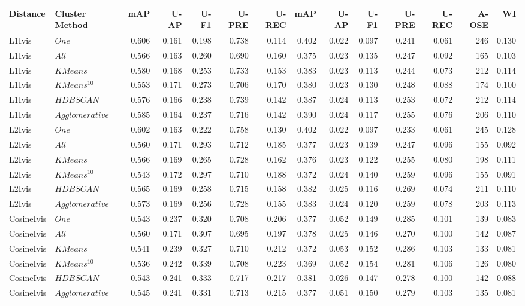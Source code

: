 \begin{tabular}{llrrrrrrrrrrrr}
\toprule
Distance & Cluster Method & mAP & U-AP & U-F1 & U-PRE & U-REC & mAP & U-AP & U-F1 & U-PRE & U-REC & A-OSE & WI \\
\midrule
L1Ivis & $One$ & 0.606 & 0.161 & 0.198 & 0.738 & 0.114 & 0.402 & 0.022 & 0.097 & 0.241 & 0.061 & 246 & 0.130 \\
L1Ivis & $All$ & 0.566 & 0.163 & 0.260 & 0.690 & 0.160 & 0.375 & 0.023 & 0.135 & 0.247 & 0.092 & 165 & 0.103 \\
L1Ivis & $KMeans$ & 0.580 & 0.168 & 0.253 & 0.733 & 0.153 & 0.383 & 0.023 & 0.113 & 0.244 & 0.073 & 212 & 0.114 \\
L1Ivis & $KMeans^{10}$ & 0.553 & 0.171 & 0.273 & 0.706 & 0.170 & 0.380 & 0.023 & 0.130 & 0.248 & 0.088 & 174 & 0.100 \\
L1Ivis & $HDBSCAN$ & 0.576 & 0.166 & 0.238 & 0.739 & 0.142 & 0.387 & 0.024 & 0.113 & 0.253 & 0.072 & 212 & 0.114 \\
L1Ivis & $Agglomerative$ & 0.585 & 0.164 & 0.237 & 0.716 & 0.142 & 0.390 & 0.024 & 0.117 & 0.255 & 0.076 & 206 & 0.110 \\
L2Ivis & $One$ & 0.602 & 0.163 & 0.222 & 0.758 & 0.130 & 0.402 & 0.022 & 0.097 & 0.233 & 0.061 & 245 & 0.128 \\
L2Ivis & $All$ & 0.560 & 0.171 & 0.293 & 0.712 & 0.185 & 0.377 & 0.023 & 0.139 & 0.247 & 0.096 & 155 & 0.092 \\
L2Ivis & $KMeans$ & 0.566 & 0.169 & 0.265 & 0.728 & 0.162 & 0.376 & 0.023 & 0.122 & 0.255 & 0.080 & 198 & 0.111 \\
L2Ivis & $KMeans^{10}$ & 0.543 & 0.172 & 0.297 & 0.710 & 0.188 & 0.372 & 0.024 & 0.140 & 0.259 & 0.096 & 155 & 0.091 \\
L2Ivis & $HDBSCAN$ & 0.565 & 0.169 & 0.258 & 0.715 & 0.158 & 0.382 & 0.025 & 0.116 & 0.269 & 0.074 & 211 & 0.110 \\
L2Ivis & $Agglomerative$ & 0.573 & 0.169 & 0.256 & 0.728 & 0.155 & 0.383 & 0.024 & 0.120 & 0.259 & 0.078 & 203 & 0.113 \\
CosineIvis & $One$ & 0.543 & 0.237 & 0.320 & 0.708 & 0.206 & 0.377 & 0.052 & 0.149 & 0.285 & 0.101 & 139 & 0.083 \\
CosineIvis & $All$ & 0.560 & 0.171 & 0.307 & 0.695 & 0.197 & 0.378 & 0.025 & 0.146 & 0.270 & 0.100 & 142 & 0.087 \\
CosineIvis & $KMeans$ & 0.541 & 0.239 & 0.327 & 0.710 & 0.212 & 0.372 & 0.053 & 0.152 & 0.286 & 0.103 & 133 & 0.081 \\
CosineIvis & $KMeans^{10}$ & 0.536 & 0.242 & 0.339 & 0.708 & 0.223 & 0.369 & 0.052 & 0.154 & 0.281 & 0.106 & 126 & 0.080 \\
CosineIvis & $HDBSCAN$ & 0.543 & 0.241 & 0.333 & 0.717 & 0.217 & 0.381 & 0.026 & 0.147 & 0.278 & 0.100 & 142 & 0.088 \\
CosineIvis & $Agglomerative$ & 0.545 & 0.241 & 0.331 & 0.713 & 0.215 & 0.377 & 0.051 & 0.150 & 0.279 & 0.103 & 135 & 0.081 \\
\bottomrule
\end{tabular}

